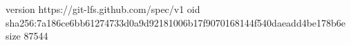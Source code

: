 version https://git-lfs.github.com/spec/v1
oid sha256:7a186ce6bb61274733d0a9d92181006b17f9070168144f540daeadd4be178b6e
size 87544
